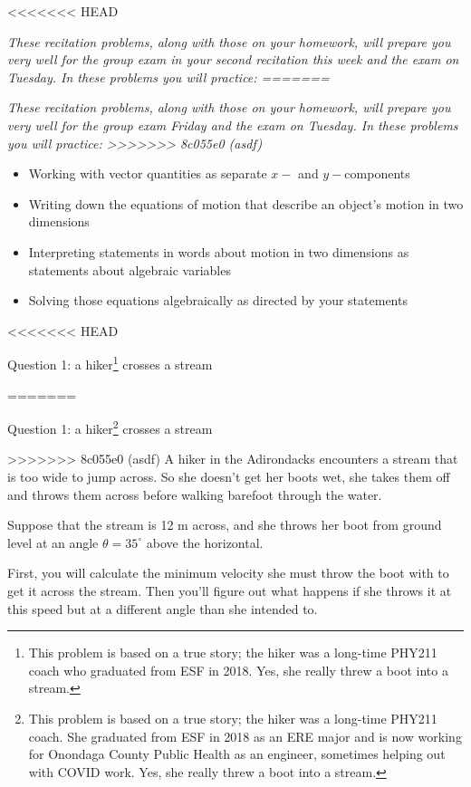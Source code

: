 \documentclass[12pt]{article}
\newcommand{\BI}{\begin{itemize}}
\newcommand{\EI}{\end{itemize}}
\begin{document}
\Large
\centerline{}
\normalsize
<<<<<<< HEAD
\centerline{}

\it These recitation problems, along with those on your homework, will prepare you very well for the group exam in your second recitation this week and the exam on Tuesday. In these problems you will practice:
=======
\centerline{}

\it These recitation problems, along with those on your homework, will prepare you very well for the group exam Friday and the exam on Tuesday. In these problems you will practice:
>>>>>>> 8c055e0 (asdf)

\rm

\BI
\item Working with vector quantities as separate $x-$ and $y-$components
\item Writing down the equations of motion that describe an object's motion in two dimensions
\item Interpreting statements in words about motion in two dimensions as statements about algebraic variables
\item Solving those equations algebraically as directed by your statements
\EI



\newpage

\rm 


<<<<<<< HEAD
\centerline{\Large Question 1: a hiker\footnote{\noindent This problem is based on a true story; the hiker was a long-time PHY211 coach who graduated from ESF in 2018. Yes, she really threw a boot into a stream.} crosses a stream}     
=======
\centerline{\Large Question 1: a hiker\footnote{\noindent This problem is based on a true story; the hiker was a long-time PHY211 coach. She graduated from ESF in 2018 as an ERE major and is now working for Onondaga County Public Health as an engineer, sometimes helping out with COVID work. Yes, she really threw a boot into a stream.} crosses a stream}     
>>>>>>> 8c055e0 (asdf)
A hiker in the Adirondacks encounters a stream that is too wide to jump across. So she doesn't get her boots wet, she takes them off and throws them across before walking barefoot through the water. 

Suppose that the stream is 12 m across, and she throws her boot from
ground level at an angle $\theta = 35^\circ$ above the horizontal.

First, you will calculate the minimum velocity she must throw the boot with to get it across the stream. Then you'll figure out what happens if she throws it at this speed but at a different angle than she intended to.
\end{document}
